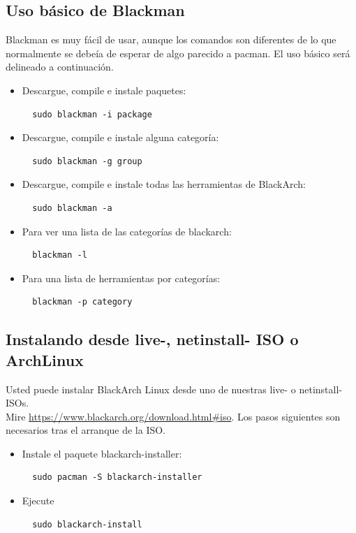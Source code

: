\documentclass[a4paper, oneside, 11pt]{book}
\begin{document}
\subsection{Uso b\'asico de Blackman} Blackman es muy f\'acil de usar, aunque los 
comandos son diferentes de lo que normalmente se debe\'ia de esperar de algo parecido
a pacman. El uso básico ser\'a delineado a continuaci\'on.
\begin{itemize}
\item Descargue, compile e instale paquetes:
\begin{lstlisting}
  sudo blackman -i package
\end{lstlisting}

\item Descargue, compile e instale alguna categor\'ia:
\begin{lstlisting}
  sudo blackman -g group
\end{lstlisting}

\item Descargue, compile e instale todas las herramientas de BlackArch:
\begin{lstlisting}
  sudo blackman -a
\end{lstlisting}

\item Para ver una lista de las categor\'ias de blackarch:
\begin{lstlisting}
  blackman -l
\end{lstlisting}

\item Para una lista de herramientas por categor\'ias:
\begin{lstlisting}
  blackman -p category
\end{lstlisting}

\end{itemize}

\subsection{Instalando desde live-, netinstall- ISO o ArchLinux}
Usted puede instalar BlackArch Linux desde uno de nuestras live- o netinstall-ISOs.\\Mire
\url{https://www.blackarch.org/download.html#iso}. Los pasos siguientes son necesarios
tras el arranque de la ISO.
\begin{itemize}
\item Instale el paquete blackarch-installer:
\begin{lstlisting}
  sudo pacman -S blackarch-installer
\end{lstlisting}

\item Ejecute
\begin{lstlisting}
  sudo blackarch-install
\end{lstlisting}

\end{itemize}
\end{document}
